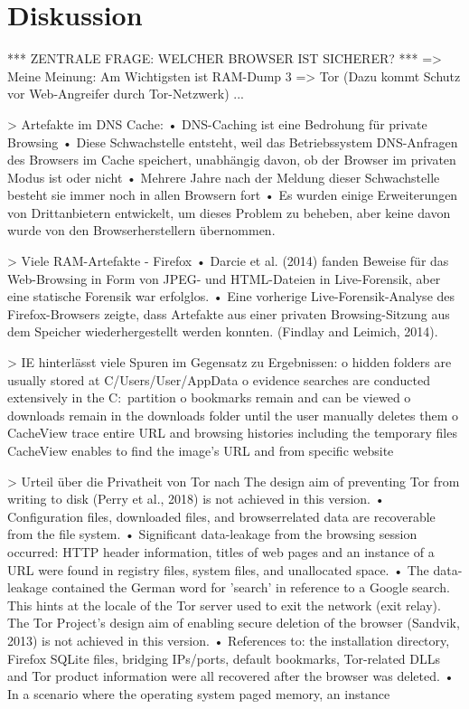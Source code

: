 \chapter{Diskussion}

*** ZENTRALE FRAGE: WELCHER BROWSER IST SICHERER? ***
=> Meine Meinung: Am Wichtigsten ist RAM-Dump 3 => Tor (Dazu kommt Schutz vor Web-Angreifer durch Tor-Netzwerk)
...




> Artefakte im DNS Cache: \cite{Satvat.2014}
	•	DNS-Caching ist eine Bedrohung für private Browsing
	•	Diese Schwachstelle entsteht, weil das Betriebssystem DNS-Anfragen des Browsers im Cache speichert, unabhängig davon, ob der Browser im privaten Modus ist oder nicht
	•	Mehrere Jahre nach der Meldung dieser Schwachstelle besteht sie immer noch in allen Browsern fort
	•	Es wurden einige Erweiterungen von Drittanbietern entwickelt, um dieses Problem zu beheben, aber keine davon wurde von den Browserherstellern übernommen.
	

> Viele RAM-Artefakte
	- Firefox \cite{Muir.2019}
		•	Darcie et al. (2014) fanden Beweise für das Web-Browsing in Form von JPEG- und HTML-Dateien in Live-Forensik, aber eine statische Forensik war erfolglos.
		•	Eine vorherige Live-Forensik-Analyse des Firefox-Browsers zeigte, dass Artefakte aus einer privaten Browsing-Sitzung aus dem Speicher wiederhergestellt werden konnten. (Findlay and Leimich, 2014). 
		

> IE hinterlässt viele Spuren im Gegensatz zu Ergebnissen: \cite{Md.2018}
	o	hidden folders are usually stored at C/Users/User/AppData
	o	evidence searches are conducted extensively in the C:\ partition
	o	bookmarks remain and can be viewed
	o	downloads remain in the downloads folder until the user manually deletes them
	o	CacheView trace entire URL and browsing histories including the temporary files
	CacheView enables to find the image’s URL and from specific website
	
> Urteil über die Privatheit von Tor nach \cite{Muir.2019}
	The design aim of preventing Tor from writing to disk (Perry et al., 2018) is not achieved in this version.
		•	Configuration files, downloaded files, and browserrelated data are recoverable from the file system.
		•	Significant data-leakage from the browsing session occurred: HTTP header information, titles of web pages and an instance of a URL were found in registry files, system files, and unallocated space.
		•	The data-leakage contained the German word for ’search’ in reference to a Google search. This hints at the locale of the Tor server used to exit the network (exit relay).
	The Tor Project’s design aim of enabling secure deletion of the browser (Sandvik, 2013) is not achieved in this version.
		•	References to: the installation directory, Firefox SQLite files, bridging IPs/ports, default bookmarks, Tor-related DLLs and Tor product information were all recovered after the browser was deleted.
		•	In a scenario where the operating system paged memory, an instance

